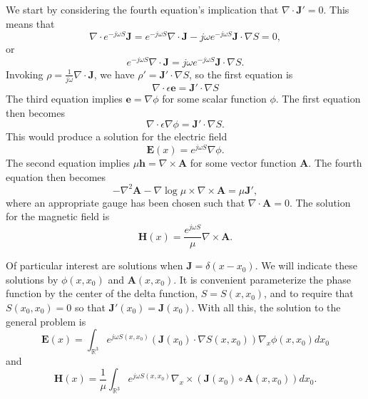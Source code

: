 \documentclass{article}
\newcommand{\Div}[0]{\nabla\cdot}
\newcommand{\Curl}[0]{\nabla\times}
\theoremstyle{plain}
\begin{document}
We start by considering the fourth equation's implication that $\Div\mathbf{J}'=0$. This means that
\begin{equation}
	\Div e^{-j\omega S}\mathbf{J} = e^{-j\omega S}\Div\mathbf{J} - j\omega e^{-j\omega S}\mathbf{J}\cdot\nabla S = 0,
\end{equation}
or
\begin{equation}
	e^{-j\omega S}\Div\mathbf{J} = j\omega e^{-j\omega S}\mathbf{J}\cdot\nabla S.
\end{equation}
Invoking $\rho = \frac{1}{j\omega}\Div\mathbf{J}$, we have $\rho' = \mathbf{J}'\cdot\nabla S$, so the first equation is
\begin{equation}
	\Div\epsilon\mathbf{e} = \mathbf{J}'\cdot\nabla S
\end{equation}
The third equation implies $\mathbf{e} = \nabla\phi$ for some scalar function $\phi$. The first equation then becomes
\begin{equation}
	\Div\epsilon\nabla\phi = \mathbf{J}'\cdot\nabla S.
\end{equation}
This would produce a solution for the electric field
\begin{equation}
	\mathbf{E}(x) = e^{j\omega S}\nabla\phi.
\end{equation}
The second equation implies $\mu\mathbf{h} = \Curl\mathbf{A}$ for some vector function $\mathbf{A}$. The fourth equation then becomes
\begin{equation}
	-\nabla^2\mathbf{A} -\nabla\log{\mu}\times\Curl\mathbf{A} = \mu\mathbf{J}',
\end{equation}
where an appropriate gauge has been chosen such that $\Div\mathbf{A}=0$. The solution for the magnetic field is
\begin{equation}
	\mathbf{H}(x) = \frac{e^{j\omega S}}{\mu}\Curl\mathbf{A}.
\end{equation}


Of particular interest are solutions when $\mathbf{J} = \delta(x-x_0)$. We will indicate these solutions by $\phi(x,x_0)$ and $\mathbf{A}(x,x_0)$. It is convenient parameterize the phase function by the center of the delta function, $S=S(x,x_0)$, and to require that $S(x_0,x_0)=0$ so that $\mathbf{J}'(x_0)=\mathbf{J}(x_0)$. With all this, the solution to the general problem is
\begin{equation}
	\mathbf{E}(x) = \int_{\mathbb{R}^3} e^{j\omega S(x,x_0)} \left( \mathbf{J}(x_0)\cdot\nabla S(x,x_0) \right)\nabla_x\phi(x,x_0) dx_0
\end{equation}
and
\begin{equation}
	\mathbf{H}(x) = \frac{1}{\mu}\int_{\mathbb{R}^3} e^{j\omega S(x,x_0)}\nabla_x\times\left( \mathbf{J}(x_0)\circ\mathbf{A}(x,x_0) \right) dx_0.
\end{equation}
\end{document}
